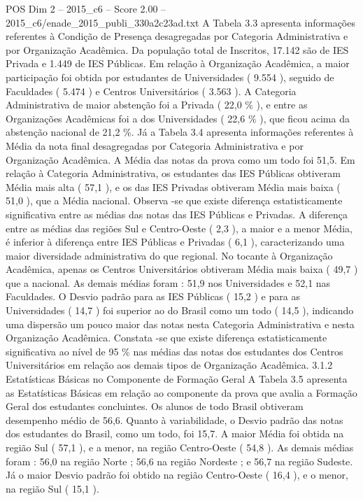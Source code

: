 \begin{textsample}{POS Dim 2 – 2015\_c6 – Score 2.00 – 2015\_c6/enade\_2015\_publi\_330a2c23ad.txt}
A Tabela 3.3 apresenta informações referentes à Condição de Presença desagregadas por Categoria Administrativa e por Organização Acadêmica.
Da população total de Inscritos, 17.142 são de IES Privada e 1.449 de IES Públicas.
Em relação à Organização Acadêmica, a maior participação foi obtida por estudantes de Universidades ( 9.554 ), seguido de Faculdades ( 5.474 ) e Centros Universitários ( 3.563 ).
A Categoria Administrativa de maior abstenção foi a Privada ( 22,0 \% ), e entre as Organizações Acadêmicas foi a dos Universidades ( 22,6 \% ), que ficou acima da abstenção nacional de 21,2 \%.
Já a Tabela 3.4 apresenta informações referentes à Média da nota final desagregadas por Categoria Administrativa e por Organização Acadêmica.
A Média das notas da prova como um todo foi 51,5.
Em relação à Categoria Administrativa, os estudantes das IES Públicas obtiveram Média mais alta ( 57,1 ), e os das IES Privadas obtiveram Média mais baixa ( 51,0 ), que a Média nacional.
Observa -se que existe diferença estatisticamente significativa entre as médias das notas das IES Públicas e Privadas.
A diferença entre as médias das regiões Sul e Centro-Oeste ( 2,3 ), a maior e a menor Média, é inferior à diferença entre IES Públicas e Privadas ( 6,1 ), caracterizando uma maior diversidade administrativa do que regional.
No tocante à Organização Acadêmica, apenas os Centros Universitários obtiveram Média mais baixa ( 49,7 ) que a nacional.
As demais médias foram : 51,9 nos Universidades e 52,1 nas Faculdades.
O Desvio padrão para as IES Públicas ( 15,2 ) e para as Universidades ( 14,7 ) foi superior ao do Brasil como um todo ( 14,5 ), indicando uma dispersão um pouco maior das notas nesta Categoria Administrativa e nesta Organização Acadêmica.
Constata -se que existe diferença estatisticamente significativa ao nível de 95 \% nas médias das notas dos estudantes dos Centros Universitários em relação aos demais tipos de Organização Acadêmica. 3.1.2 Estatísticas Básicas no Componente de Formação Geral A Tabela 3.5 apresenta as Estatísticas Básicas em relação ao componente da prova que avalia a Formação Geral dos estudantes concluintes.
Os alunos de todo Brasil obtiveram desempenho médio de 56,6.
Quanto à variabilidade, o Desvio padrão das notas dos estudantes do Brasil, como um todo, foi 15,7.
A maior Média foi obtida na região Sul ( 57,1 ), e a menor, na região Centro-Oeste ( 54,8 ).
As demais médias foram : 56,0 na região Norte ; 56,6 na região Nordeste ; e 56,7 na região Sudeste.
Já o maior Desvio padrão foi obtido na região Centro-Oeste ( 16,4 ), e o menor, na região Sul ( 15,1 ).

\end{textsample}
